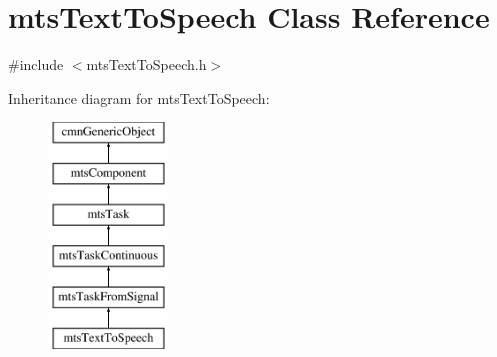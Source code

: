 \hypertarget{classmts_text_to_speech}{\section{mts\-Text\-To\-Speech Class Reference}
\label{classmts_text_to_speech}
}


{\ttfamily \#include $<$mts\-Text\-To\-Speech.\-h$>$}

Inheritance diagram for mts\-Text\-To\-Speech\-:\begin{figure}[H]
\begin{center}
\leavevmode
\includegraphics[height=6.000000cm]{d4/d58/classmts_text_to_speech}
\end{center}
\end{figure}
